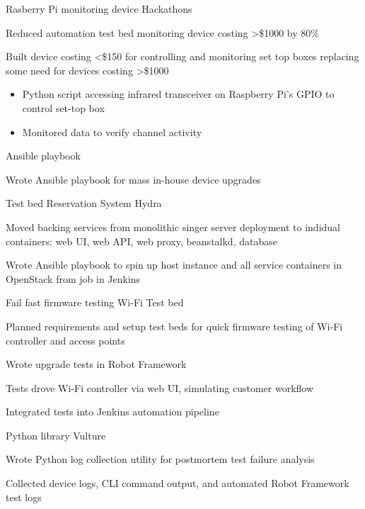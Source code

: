 
\begin{cventries}
  \cventry
    {Rasberry Pi monitoring device}
    {Hackathons}
    {}
    {}
    {
      \begin{cvitems}
      \item {Reduced automation test bed monitoring device costing >\$1000 by 80\%}
      \item {Built device costing <\$150 for controlling and monitoring set top boxes replacing some need for devices costing >\$1000}
        \begin{itemize}
        \item {Python script accessing infrared transceiver on Raspberry Pi's GPIO to control set-top box}
        \item {Monitored data to verify channel activity}
        \end{itemize}
      \end{cvitems}
    }

  \cventry
    {Ansible playbook}
    {}
    {}
    {}
    {
      \begin{cvitems}
      \item {Wrote Ansible playbook for mass in-house device upgrades}
      \end{cvitems}
    }

  \cventry
    {Test bed Reservation System}
    {Hydra}
    {}
    {}
    {
      \begin{cvitems} %
      \item {Moved backing services from monolithic singer server deployment to indidual containers: web UI, web API, web proxy, beanstalkd, database}
      \item {Wrote Ansible playbook to spin up host instance and all service containers in OpenStack from job in Jenkins}
      \end{cvitems}
    }

  \cventry
    {Fail fast firmware testing}
    {Wi-Fi Test bed}
    {}
    {}
    {
      \begin{cvitems} %
      \item {Planned requirements and setup test beds for quick firmware testing of Wi-Fi controller and access points}
      \item {Wrote upgrade tests in Robot Framework}
      \item {Tests drove Wi-Fi controller via web UI, simulating customer workflow}
      \item {Integrated tests into Jenkins automation pipeline}
      \end{cvitems}
    }

  \cventry
    {Python library}
    {Vulture}
    {}
    {}
    {
      \begin{cvitems} %
      \item {Wrote Python log collection utility for postmortem test failure analysis}
      \item {Collected device logs, CLI command output, and automated Robot Framework test logs}
      \end{cvitems}
    }

\end{cventries}
